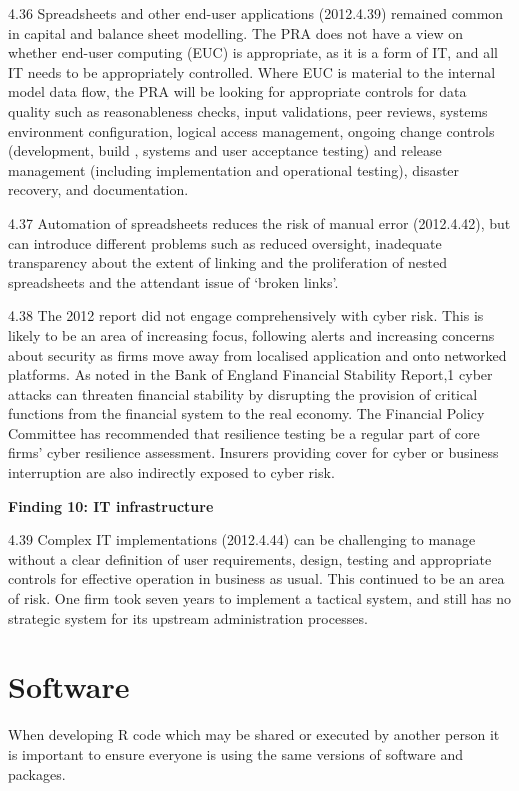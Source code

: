 \documentclass[]{book}
\theoremstyle{definition}
\theoremstyle{definition}
\theoremstyle{definition}
\theoremstyle{remark}
\begin{document}
4.36 Spreadsheets and other end-user applications (2012.4.39) remained
common in capital and balance sheet modelling. The PRA does not have a
view on whether end-user computing (EUC) is appropriate, as it is a form
of IT, and all IT needs to be appropriately controlled. Where EUC is
material to the internal model data flow, the PRA will be looking for
appropriate controls for data quality such as reasonableness checks,
input validations, peer reviews, systems environment configuration,
logical access management, ongoing change controls (development, build ,
systems and user acceptance testing) and release management (including
implementation and operational testing), disaster recovery, and
documentation.

4.37 Automation of spreadsheets reduces the risk of manual error
(2012.4.42), but can introduce different problems such as reduced
oversight, inadequate transparency about the extent of linking and the
proliferation of nested spreadsheets and the attendant issue of `broken
links'.

4.38 The 2012 report did not engage comprehensively with cyber risk.
This is likely to be an area of increasing focus, following alerts and
increasing concerns about security as firms move away from localised
application and onto networked platforms. As noted in the Bank of
England Financial Stability Report,1 cyber attacks can threaten
financial stability by disrupting the provision of critical functions
from the financial system to the real economy. The Financial Policy
Committee has recommended that resilience testing be a regular part of
core firms' cyber resilience assessment. Insurers providing cover for
cyber or business interruption are also indirectly exposed to cyber
risk.

\textbf{Finding 10: IT infrastructure}

4.39 Complex IT implementations (2012.4.44) can be challenging to manage
without a clear definition of user requirements, design, testing and
appropriate controls for effective operation in business as usual. This
continued to be an area of risk. One firm took seven years to implement
a tactical system, and still has no strategic system for its upstream
administration processes.

\chapter{Software}\label{software}

When developing R code which may be shared or executed by another person
it is important to ensure everyone is using the same versions of
software and packages.
\end{document}
